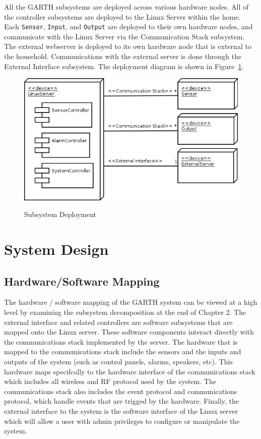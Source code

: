 \documentclass{report}
\begin{document}
All the GARTH subsystems are deployed across various hardware
nodes. All of the controller subsystems are deployed to the Linux
Server within the home. Each \texttt{Sensor}, \texttt{Input}, and
\texttt{Output} are deployed to their own hardware nodes, and
communicate with the Linux Server via the Communication Stack
subsystem. The external webserver is deployed to its own hardware node
that is external to the household. Communications with the external
server is done through the External Interface subsystem. The
deployment diagram is shown in Figure~\ref{fig:subsystem_deployment}.

\begin{figure}[hp]
  \centering
  \caption{Subsystem Deployment}
  \includegraphics[scale=0.5]{deployment.png}
  \label{fig:subsystem_deployment}
\end{figure}

\chapter{System Design} %
\label{ch:system-design}

\section{Hardware/Software Mapping}

The hardware / software mapping of the GARTH system can be viewed at a high
level by examining the subsystem decomposition at the end of Chapter 2. The
external interface and related controllers are software subsystems that are
mapped onto the Linux server. These software components interact directly with
the communications stack implemented by the server. The hardware that is mapped
to the communications stack include the sensors and the inputs and outputs of
the system (such as control panels, alarms, speakers, etc). This hardware maps
specifcally to the hardware interface of the communications stack which
includes all wireless and RF protocol used by the system. The communications
stack also includes the event protocol and communications protocol, which
handle events that are trigged by the hardware. Finally, the external interface
to the system is the software interface of the Linux server which will allow a
user with admin privileges to configure or manipulate the system.
\end{document}
